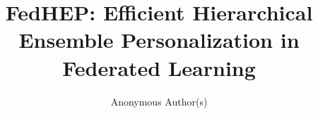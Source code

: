 \documentclass[sigconf,anonymous,screen]{aamas}
\title{FedHEP: Efficient Hierarchical Ensemble Personalization in Federated Learning}
\author{Anonymous Author(s)}
\begin{document}
\maketitle






\FloatBarrier


\begin{acks}
\end{acks}

\balance

\clearpage
\nobalance



\end{document}
